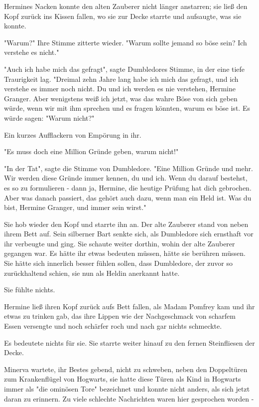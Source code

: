 {Hermines Nacken konnte den alten Zauberer nicht länger anstarren; sie ließ den Kopf zurück ins Kissen fallen, wo sie zur Decke starrte und aufsaugte, was sie konnte.

"Warum?" Ihre Stimme zitterte wieder. "Warum sollte jemand so böse sein? Ich verstehe es nicht."

"Auch ich habe mich das gefragt", sagte Dumbledores Stimme, in der eine tiefe Traurigkeit lag. "Dreimal zehn Jahre lang habe ich mich das gefragt, und ich verstehe es immer noch nicht. Du und ich werden es nie verstehen, Hermine Granger. Aber wenigstens weiß ich jetzt, was das wahre Böse von sich geben würde, wenn wir mit ihm sprechen und es fragen könnten, warum es böse ist. Es würde sagen: "Warum nicht?"

Ein kurzes Aufflackern von Empörung in ihr.

"Es muss doch eine Million Gründe geben, warum nicht!"

"In der Tat", sagte die Stimme von Dumbledore. "Eine Million Gründe und mehr. Wir werden diese Gründe immer kennen, du und ich. Wenn du darauf bestehst, es so zu formulieren - dann ja, Hermine, die heutige Prüfung hat dich gebrochen. Aber was danach passiert, das gehört auch dazu, wenn man ein Held ist. Was du bist, Hermine Granger, und immer sein wirst."

Sie hob wieder den Kopf und starrte ihn an. Der alte Zauberer stand von neben ihrem Bett auf. Sein silberner Bart senkte sich, als Dumbledore sich ernsthaft vor ihr verbeugte und ging. Sie schaute weiter dorthin, wohin der alte Zauberer gegangen war. Es hätte ihr etwas bedeuten müssen, hätte sie berühren müssen. Sie hätte sich innerlich besser fühlen sollen, dass Dumbledore, der zuvor so zurückhaltend schien, sie nun als Heldin anerkannt hatte.

Sie fühlte nichts.

Hermine ließ ihren Kopf zurück aufs Bett fallen, als Madam Pomfrey kam und ihr etwas zu trinken gab, das ihre Lippen wie der Nachgeschmack von scharfem Essen versengte und noch schärfer roch und nach gar nichts schmeckte.

Es bedeutete nichts für sie. Sie starrte weiter hinauf zu den fernen Steinfliesen der Decke.

Minerva wartete, ihr Bestes gebend, nicht zu schweben, neben den Doppeltüren zum Krankenflügel von Hogwarts, sie hatte diese Türen als Kind in Hogwarts immer als "die ominösen Tore" bezeichnet und konnte nicht anders, als sich jetzt daran zu erinnern. Zu viele schlechte Nachrichten waren hier gesprochen worden -

}
